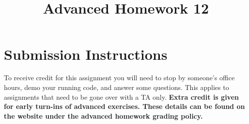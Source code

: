 \documentclass{article}
\begin{document}
\fancyfoot[C]{\color{gray} \thepage~/~\pageref*{LastPage}}
\pagestyle{fancyplain}

\title{\textbf{Advanced Homework 12\\}}
\author{\textbf{\color{red}{Due: Wednesday, April 4th, 11:59PM (Hard Deadline)}}}
\date{}
\maketitle


\section*{Submission Instructions}
To receive credit for this assignment you will need to stop by someone's
office hours, demo your running code, and answer some questions. \textbf{\color{red}{Make sure
to check the office hour schedule as the real due date is at the last office
hours before the date listed above.}} This applies to assignments that need to be gone over with a TA only.
\textbf{Extra credit is given for early turn-ins of advanced exercises. These details can be found on the website under the advanced homework grading policy.}

\medskip
\end{document}
